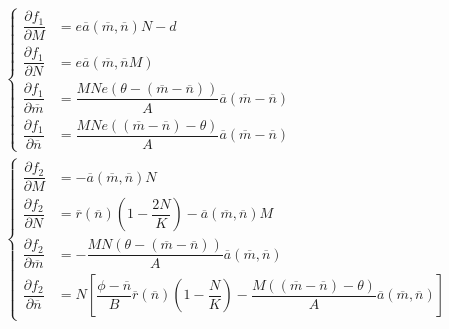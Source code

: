 \documentclass[12pt]{article}
\begin{document}
\begin{align*}
	&\begin{cases}
		\dfrac{\partial f_1}{\partial M} &= e\overline{a}(\overline{m}, \overline{n})N - d \\[.25cm]
		\dfrac{\partial f_1}{\partial N} &= e\overline{a}(\overline{m}, \overline{n}M) \\[.25cm]
		\dfrac{\partial f_1}{\partial \overline{m}} &= \dfrac{MNe(\theta - (\overline{m} - \overline{n}))}{A}\overline{a}(\overline{m} - \overline{n}) \\[.25cm]
		\dfrac{\partial f_1}{\partial \overline{n}} &= \dfrac{MNe((\overline{m} - \overline{n}) - \theta)}{A}\overline{a}(\overline{m} - \overline{n})
	\end{cases}\\
	&\begin{cases}
		\dfrac{\partial f_2}{\partial M} &= -\overline{a}(\overline{m}, \overline{n})N \\[.25cm]
		\dfrac{\partial f_2}{\partial N} &= \overline{r}(\overline{n})\left(1 - \dfrac{2N}{K}\right) - \overline{a}(\overline{m}, \overline{n})M \\[.25cm]
		\dfrac{\partial f_2}{\partial \overline{m}} &= -\dfrac{MN(\theta - (\overline{m} - \overline{n}))}{A}\overline{a}(\overline{m}, \overline{n}) \\[.25cm]
		\dfrac{\partial f_2}{\partial \overline{n}} &= N\left[\dfrac{\phi - \overline{n}}{B}\overline{r}(\overline{n})\left(1 - \dfrac{N}{K}\right) - \dfrac{M((\overline{m} - \overline{n}) - \theta)}{A}\overline{a}(\overline{m}, \overline{n})\right]
	\end{cases}
\end{align*}
\end{document}

